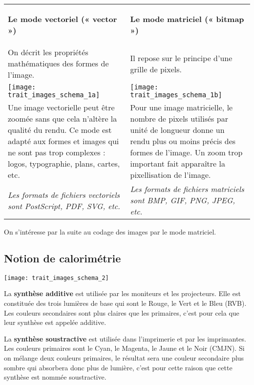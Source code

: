 \begin{center}
\begin{tabular}{|p{8cm}|p{8cm}|}
\hline \begin{center}
\textbf{Le mode vectoriel (« vector »)} 
\end{center}
&
\begin{center}
\textbf{ Le mode matriciel (« bitmap »)} 
\end{center}
\\
On décrit les propriétés mathématiques des formes de l'image. & Il repose sur le principe d'une grille de pixels.\\
\texttt{[image: trait\_images\_schema\_1a]}&\texttt{[image: trait\_images\_schema\_1b]}\\
Une image vectorielle peut être zoomée sans que cela n'altère la qualité du rendu. Ce mode est adapté aux formes et images qui ne sont pas trop complexes : logos, typographie, plans, cartes, etc.  & Pour une image matricielle, le nombre de pixels utilisés par unité de longueur donne un rendu plus ou moins précis des formes de l'image. Un zoom trop important fait apparaître la pixellisation de l'image.\\
\textit{Les formats de fichiers vectoriels sont PostScript, PDF, SVG, etc.}&\textit{ Les formats de fichiers matriciels sont BMP, GIF, PNG, JPEG, etc.}\\
\hline
\end{tabular}
\end{center}

\vspace{0.2cm}
On s'intéresse par la suite au codage des images par le mode matriciel.

\subsection{Notion de calorimétrie}

\begin{center}
{\texttt{[image: trait\_images\_schema\_2]}}
\end{center}

La \textbf{synthèse additive} est utilisée par les moniteurs et les projecteurs.
Elle est constituée des trois lumières de base qui sont le Rouge, le Vert
et le Bleu (RVB). Les couleurs secondaires sont plus claires
que les primaires, c'est pour cela que leur synthèse est appelée additive.

La \textbf{synthèse soustractive} est utilisée dans l'imprimerie et par
les imprimantes. Les couleurs primaires sont le Cyan, le Magenta,
le Jaune et le Noir (CMJN). Si on mélange deux couleurs primaires, 
le résultat sera une couleur secondaire plus sombre qui absorbera 
donc plus de lumière, c'est pour cette raison que cette synthèse
est nommée soustractive.

